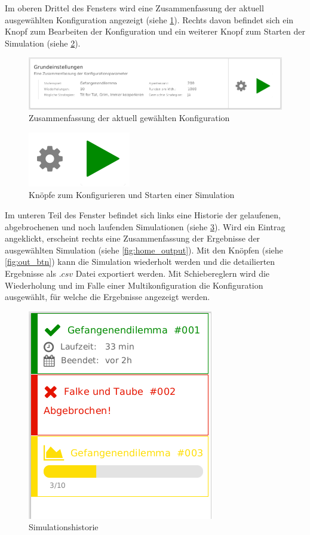 \documentclass[parskip=full,11pt]{scrartcl}
\begin{document}
Im oberen Drittel des Fensters wird eine Zusammenfassung der aktuell ausgewählten Konfiguration angezeigt (siehe \cref{fig:home_top}). Rechts davon befindet sich ein Knopf zum Bearbeiten der Konfiguration und ein weiterer Knopf zum Starten der Simulation (siehe \cref{fig:main_btn}).
 
\begin{figure}[hb]
	\centering
	\includegraphics[width=\textwidth]{images/home_top.png}
	\caption{\label{fig:home_top}
	Zusammenfassung der aktuell gewählten Konfiguration}
\end{figure} 
 
\begin{figure}[ht]
	\centering
 	\includegraphics{images/main_btn.png}
 	\caption{\label{fig:main_btn}
 		Knöpfe zum Konfigurieren und Starten einer Simulation}
\end{figure}


\newpage
Im unteren Teil des Fenster befindet sich links eine Historie der gelaufenen, abgebrochenen und noch laufenden Simulationen (siehe \cref{fig:history}). Wird ein Eintrag angeklickt, erscheint rechts eine Zusammenfassung der Ergebnisse der ausgewählten Simulation (siehe \cref{fig:home_output}). Mit den Knöpfen (siehe \cref{fig:out_btn}) kann die Simulation wiederholt werden und die detailierten Ergebnisse als \(.csv\) Datei exportiert werden. Mit Schiebereglern wird die Wiederholung und im Falle einer Multikonfiguration die Konfiguration ausgewählt, für welche die Ergebnisse angezeigt werden.



\begin{figure}[hb]
	\centering
	\includegraphics[height=0.5\linewidth ]{images/history.png}
	\caption{\label{fig:history}
		Simulationshistorie }
\end{figure}
\end{document}
